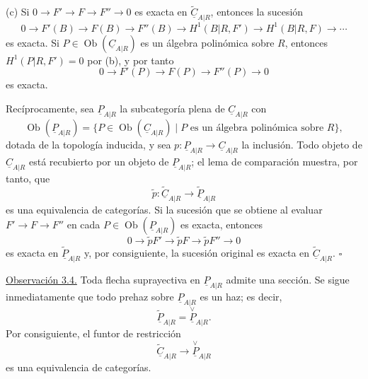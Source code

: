 (c) Si
$0\longrightarrow F'\longrightarrow F\longrightarrow F''
\longrightarrow0$ es exacta en
$\widetilde{\underline C}_{A|R}$, entonces la sucesión
\[
 0\longrightarrow F'(B)\longrightarrow F(B)
 \longrightarrow F''(B)
 \longrightarrow H^1(B|R,F')\longrightarrow H^1(B|R,F)
 \longrightarrow\cdots
\]
es exacta. Si $P\in\operatorname{Ob}(\underline C_{A|R})$ es un
álgebra polinómica sobre $R$, entonces $H^1(P|R,F')=0$ por (b), y por
tanto
\[
 0\longrightarrow F'(P)\longrightarrow F(P)
 \longrightarrow F''(P)\longrightarrow0
\]
es exacta.

Recíprocamente, sea $\underline P_{A|R}$ la subcategoría plena de
$\underline C_{A|R}$ con
\[
 \operatorname{Ob}(\underline P_{A|R})=
 \{P\in\operatorname{Ob}(\underline C_{A|R})\mid
   P\text{ es un álgebra polinómica sobre }R\},
\]
dotada de la topología inducida, y sea
$p:\underline P_{A|R}\longrightarrow\underline C_{A|R}$ la inclusión.
Todo objeto de $\underline C_{A|R}$ está recubierto por un objeto de
$\underline P_{A|R}$; el lema de comparación muestra, por tanto, que
\[
 \widetilde p:\widetilde{\underline C}_{A|R}
 \longrightarrow\widetilde{\underline P}_{A|R}
\]
es una equivalencia de categorías. Si la sucesión que se obtiene al
evaluar $F'\longrightarrow F\longrightarrow F''$ en cada
$P\in\operatorname{Ob}(\underline P_{A|R})$ es exacta, entonces
\[
 0\longrightarrow\widetilde pF'\longrightarrow\widetilde pF
 \longrightarrow\widetilde pF''\longrightarrow0
\]
es exacta en $\widetilde{\underline P}_{A|R}$ y, por consiguiente, la
sucesión original es exacta en
$\widetilde{\underline C}_{A|R}$. \hfill$\square$


\underline{Observación 3.4.} Toda flecha suprayectiva en
$\underline P_{A|R}$ admite una sección. Se sigue inmediatamente que
todo prehaz sobre $\underline P_{A|R}$ es un haz; es decir,
\[
 \widetilde{\underline P}_{A|R}=
 \overset{\vee}{\underline P}_{A|R}.
\]
Por consiguiente, el funtor de restricción
\[
 \widetilde{\underline C}_{A|R}
 \longrightarrow\overset{\vee}{\underline P}_{A|R}
\]
es una equivalencia de categorías.
